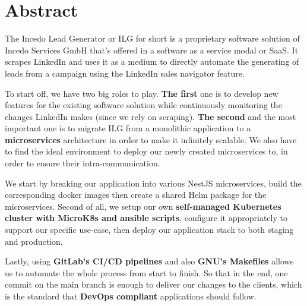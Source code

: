 \section*{Abstract}
The Incedo Lead Generator or ILG for short is a proprietary software solution of Incedo Services GmbH that's offered in a software as a service modal or SaaS.
It scrapes LinkedIn and uses it as a medium to directly automate the generating of leads from a campaign using the LinkedIn sales navigator feature.

To start off, we have two big roles to play.
\textbf{The first} one is to develop new features for the existing software solution while continuously monitoring the changes LinkedIn makes (since we rely on scraping).
\textbf{The second} and the most important one is to migrate ILG from a monolithic application to a \textbf{microservices} architecture in order to make it infinitely scalable. We also have to find the ideal environment to deploy our newly created microservices to, in order to ensure their intra-communication.

We start by breaking our application into various NestJS microservices, build the corresponding docker images then create a shared Helm package for the microservices. Second of all, we setup our own \textbf{self-managed Kubernetes cluster with MicroK8s and ansible scripts}, configure it appropriately to support our specific use-case, then deploy our application stack to both staging and production.

Lastly, using \textbf{GitLab's CI/CD pipelines} and also \textbf{GNU's Makefiles} allows us to automate the whole process from start to finish. So that in the end, one commit on the main branch is enough to deliver our changes to the clients, which is the standard that \textbf{DevOps compliant} applications should follow.

\newpage
